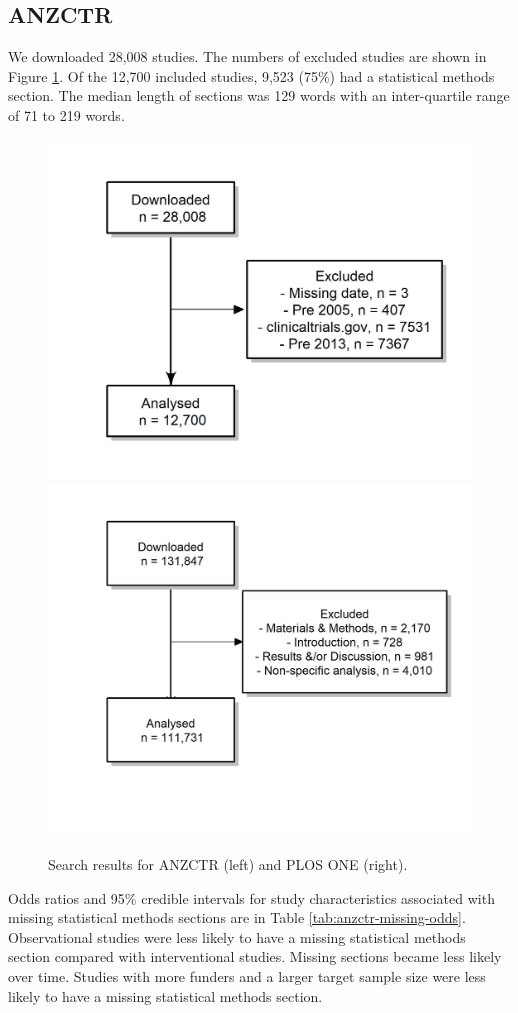 \documentclass[12pt]{article}
\begin{document}
\subsection{ANZCTR}

We downloaded 28,008 studies. The numbers of excluded studies are shown
in Figure \ref{fig:consort-diagrams}. Of the 12,700 included studies,
9,523 (75\%) had a statistical methods section. The median length of
sections was 129 words with an inter-quartile range of 71 to 219 words.

\begin{figure}[htbp]

{\centering \includegraphics[width=0.49\linewidth]{figures/excluded_anzctr_missing}  \includegraphics[width=0.49\linewidth]{figures/excluded_plosone}

}

\caption{\label{fig:consort-diagrams}Search results for ANZCTR (left) and PLOS ONE (right).}
\end{figure}


Odds ratios and 95\% credible intervals for study characteristics
associated with missing statistical methods sections are in Table
\ref{tab:anzctr-missing-odds}. Observational studies were less likely to
have a missing statistical methods section compared with interventional
studies. Missing sections became less likely over time. Studies with
more funders and a larger target sample size were less likely to have a
missing statistical methods section.
\end{document}
